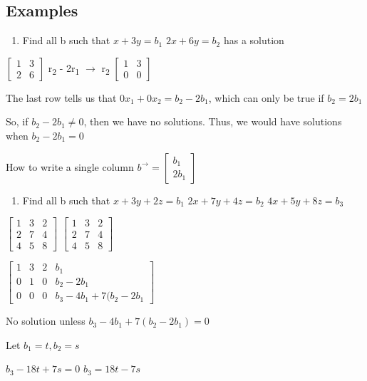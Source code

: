 \documentclass[11pt]{article}
\begin{document}
\subsection{Examples}
\label{sec:orgda218d6}
\begin{enumerate}
\item Find all b such that \(x+3y=b_{1}\) \(2x+6y=b_{2}\) has a solution
\end{enumerate}
\(\begin{bmatrix}1&3\\2&6\end{bmatrix}\)
r\textsubscript{2} - 2r\textsubscript{1} \(\rightarrow\) r\textsubscript{2}
\(\begin{bmatrix}1&3\\0&0\end{bmatrix}\)

The last row tells us that \(0x_1 + 0x_2 = b_2 - 2b_1\), which can only be true if \(b_2 = 2b_1\)

So, if \(b_2 - 2b_1 \neq{} 0\), then we have no solutions. Thus, we would have solutions when \(b_2 - 2b_1 = 0\)

How to write a single column \(b^{\rightarrow{}} = \begin{bmatrix}b_1\\2b_1\end{bmatrix}\)

\begin{enumerate}
\item Find all b such that \(x+3y+2z=b_{1}\) \(2x+7y+4z=b_{2}\) \(4x+5y+8z=b_{3}\)
\end{enumerate}
\(\begin{bmatrix}1&3&2\\2&7&4\\4&5&8\end{bmatrix}\)
\(\begin{bmatrix}1&3&2\\2&7&4\\4&5&8\end{bmatrix}\)

\(\left[\begin{array}{ccc|c}1&3&2&b_1\\0&1&0&b_{2}-2b_{1}\\0&0&0&b_{3}-4b_{1}+7(b_{2}-2b_{1}\end{array}\right]\)

No solution unless \(b_3-4b_1+7(b_2-2b_1) = 0\)

Let \(b_1 = t, b_2 = s\)

\(b_3 - 18t + 7s = 0\)
\(b_3 = 18t - 7s\)
\end{document}
